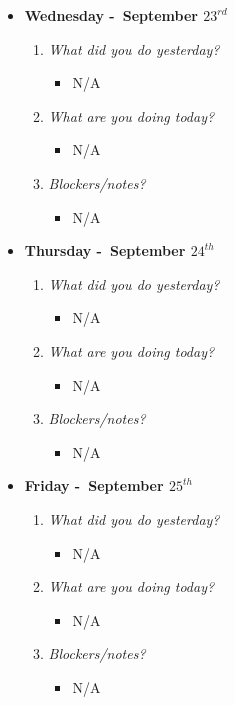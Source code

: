\begin{itemize}
  \item[] \textbf{\large Wednesday -\ September \(23^{rd}\)}
  \begin{enumerate}
    \item \textsl{What did you do yesterday?}
    \begin{itemize}
      \item N/A
    \end{itemize}
    \item \textsl{What are you doing today?}
    \begin{itemize}
      \item N/A
    \end{itemize}
    \item \textsl{Blockers/notes?}
    \begin{itemize}
      \item N/A
    \end{itemize}
  \end{enumerate}
\end{itemize}
\textbf{}
\begin{itemize}
  \item[] \textbf{\large Thursday -\ September \(24^{th}\)}
  \begin{enumerate}
    \item \textsl{What did you do yesterday?}
    \begin{itemize}
      \item N/A
    \end{itemize}
    \item \textsl{What are you doing today?}
    \begin{itemize}
      \item N/A
    \end{itemize}
    \item \textsl{Blockers/notes?}
    \begin{itemize}
      \item N/A
    \end{itemize}
  \end{enumerate}
\end{itemize}
\textbf{}
\begin{itemize}
  \item[] \textbf{\large Friday -\ September \(25^{th}\)}
  \begin{enumerate}
    \item \textsl{What did you do yesterday?}
    \begin{itemize}
      \item N/A
    \end{itemize}
    \item \textsl{What are you doing today?}
    \begin{itemize}
      \item N/A
    \end{itemize}
    \item \textsl{Blockers/notes?}
    \begin{itemize}
      \item N/A
    \end{itemize}
  \end{enumerate}
\end{itemize}